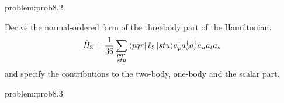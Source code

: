 \begin{sol}{problem:prob8.2}

\end{sol}



\begin{prob}\label{problem:prob8.3}
     Derive the normal-ordered form of the threebody part of the Hamiltonian.
    \begin{align*}
    \hat{H}_3 &= \frac{1}{36} \sum_{\substack{
                        pqr \\
                        stu}}
                 \bra{pqr}\hat{v}_3\,|{stu}\rangle a^\dagger_p a^\dagger_q a^\dagger_r a_u a_t a_s\\
    \end{align*}
and specify the contributions to the two-body, one-body and the scalar part.
\end{prob}

\begin{sol}{problem:prob8.3}

\end{sol}


